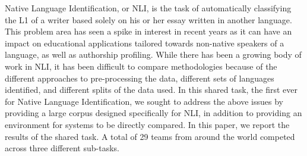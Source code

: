 Native Language Identification, or NLI, is the task of automatically classifying
 the L1 of a writer based solely on his or her essay written in another
 language.  This problem area has
 seen a spike in interest in recent years as it can have an impact on
 educational applications tailored towards non-native speakers of a language,
 as well as authorship profiling.
 While there has been a growing body of work in NLI, it has been difficult to
 compare
 methodologies because of the different approaches to pre-processing the data,
 different
 sets of languages identified, and different splits of the data used.
 In this shared task, the first
 ever for Native Language Identification, we sought to
 address the above issues by providing a large corpus designed specifically for
 NLI,
 in addition to providing an environment for systems to be directly compared.
 In this paper, we report the results of the shared task.
 A total of 29 teams from around the world competed across
 three different sub-tasks.

